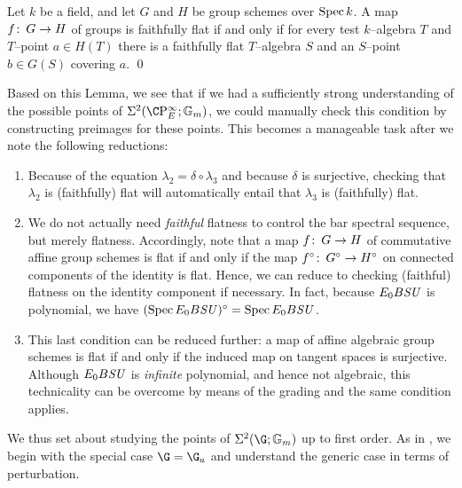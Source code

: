 \begin{lemma}
Let \(k\) be a field, and let \(G\) and \(H\) be group schemes over \(\operatorname{Spec} k\).  A map \(f\colon\thinspace G \to H\) of groups is faithfully flat if and only if for every test \(k\)--algebra \(T\) and \(T\)--point \(a \in H(T)\) there is a faithfully flat \(T\)--algebra \(S\) and an \(S\)--point \(b \in G(S)\) covering \(a\). \qed
\end{lemma}

\noindent Based on this Lemma, we see that if we had a sufficiently strong understanding of the possible points of \(\Sigma^2(\CP^\infty_E; \Gm)\), we could manually check this condition by constructing preimages for these points.  This becomes a manageable task after we note the following reductions:
\begin{enumerate}
    \item Because of the equation \(\lambda_2 = \delta \circ \lambda_3\) and because \(\delta\) is surjective, checking that \(\lambda_2\) is (faithfully) flat will automatically entail that \(\lambda_3\) is (faithfully) flat.
    \item We do not actually need \emph{faithful} flatness to control the bar spectral sequence, but merely flatness.  Accordingly, note that a map \(f\colon\thinspace G \to H\) of commutative affine group schemes is flat if and only if the map \(f^\circ\colon\thinspace G^\circ \to H^\circ\) on connected components of the identity is flat.  Hence, we can reduce to checking (faithful) flatness on the identity component if necessary.  In fact, because \(E_0 B\mathit{SU}\) is polynomial, we have \((\operatorname{Spec} E_0 B\mathit{SU})^\circ = \operatorname{Spec} E_0 B\mathit{SU}\).
    \item This last condition can be reduced further: a map of affine algebraic group schemes is flat if and only if the induced map on tangent spaces is surjective.  Although \(E_0 B\mathit{SU}\) is \emph{infinite} polynomial, and hence not algebraic, this technicality can be overcome by means of the grading and the same condition applies.
\end{enumerate}

We thus set about studying the points of \(\Sigma^2(\G; \Gm)\) up to first order.  As in , we begin with the special case \(\G = \G_a\) and understand the generic case in terms of perturbation.

